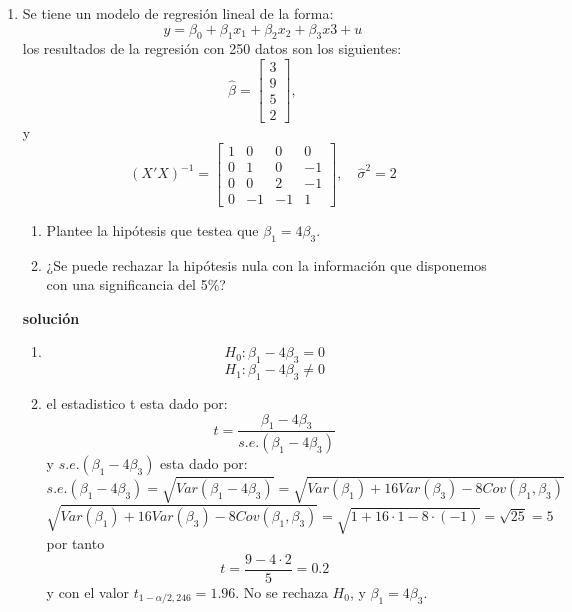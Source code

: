 \documentclass[10pt,a4paper]{article}
\begin{document}
\begin{enumerate}
\begin{enumerate}[label=\alph*)]
          \item El intervalo de confianza al 95\% es:
                \[
                  \left[
                    \hat\beta_1 - t_{2.5\%} \times s.e.(\hat\beta_1),
                    \hat\beta_1 + t_{2.5\%} \times s.e.(\hat\beta_1)
                  \right]
                  =
                  \left[
                    2.7 - 1.96 \times 0.9,
                    2.7 + 1.96 \times 0.9
                  \right]
                  =
                  \left[
                    0.934, 4.466
                  \right].
                \]
                \textbf{Interpretación:} Con 95\% de confianza, se espera que
                el verdadero efecto de \( X_1 \) sobre la variable dependiente
                esté entre 0.934 y 4.466 unidades. Es decir, un aumento en
                \( X_1 \) está asociado, en promedio, a un aumento positivo y
                significativo en la variable dependiente.
        \end{enumerate}

\item Se tiene un modelo de regresión lineal de la forma:
$$y=\beta_0 + \beta_1 x_1+\beta_2x_2+\beta_3 x3 + u$$
los resultados de la regresión con 250 datos son los siguientes:
        \[
          \hat{\beta} = \begin{bmatrix} 3 \\ 9 \\ 5 \\2 \end{bmatrix},
        \]
y 
        \[
          (X'X)^{-1} =
          \begin{bmatrix}
1 & 0  & 0  &  0\\
0 & 1  & 0  & -1\\
0 & 0  & 2  & -1\\
0 & -1 & -1 &  1
\end{bmatrix},
          \quad \hat{\sigma}^2 = 2
        \]
\begin{enumerate}
    \item Plantee la hipótesis que testea que $\beta_1=4\beta_3$.

    \item ¿Se puede rechazar la hipótesis nula con la información que disponemos con una significancia del 5\%?

\end{enumerate}

\textbf{solución}
\begin{enumerate}
    \item $$H_0 : \beta_1-4\beta_3 = 0$$
$$H_1 : \beta_1-4\beta_3 \neq 0$$
\item el estadistico t esta dado por:
$$t = \frac{\beta_1-4\beta_3}{s.e.(\beta_1-4\beta_3)}$$
y $s.e.(\beta_1-4\beta_3)$ esta dado por:
$$s.e.(\beta_1-4\beta_3)=\sqrt{Var(\beta_1-4\beta_3)}=\sqrt{Var(\beta_1)+16Var(\beta_3)-8Cov(\beta_1,\beta_3)}$$
$$\sqrt{Var(\beta_1)+16Var(\beta_3)-8Cov(\beta_1,\beta_3)}=\sqrt{1+16\cdot 1-8 \cdot (-1)}=\sqrt{25}=5$$
por tanto 
$$t = \frac{9-4\cdot2}{5}=0.2$$
y con el valor $t_{1-\alpha/2,246}=1.96$. No se rechaza $H_0$, y $\beta_1=4\beta_3$. 
\end{enumerate}


\end{enumerate}
\end{document}
